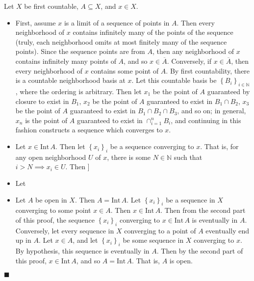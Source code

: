 \documentclass[12pt]{article}
\renewcommand{\qed}{\hfill$\blacksquare$}
\renewenvironment{proof}{\begin{addmargin}[1em]{0em}\begin{newproof}}{\end{newproof}\end{addmargin}\qed}
\begin{document}
\begin{proof}
Let $X$ be first countable, $A\subseteq X$, and $x\in X$.
\begin{itemize}
	\item First, assume $x$ is a limit of a sequence of points in $A$. Then every neighborhood of $x$ contains infinitely many of the points of the sequence (truly, each neighborhood omits at most finitely many of the sequence points). Since the sequence points are from $A$, then any neighborhood of $x$ contains infinitely many points of $A$, and so $x\in \overline{A}$. Conversely, if $x\in \overline{A}$, then every neighborhood of $x$ contains some point of $A$. By first countability, there is a countable neighborhood basis at $x$. Let this countable basis be $\left\{B_i\right\}_{i \in \mathbb{N}}$, where the ordering is arbitrary. Then let $x_1$ be the point of $A$ guaranteed by closure to exist in $B_1$, $x_2$ be the point of $A$ guaranteed to exist in $B_1\cap B_2$, $x_3$ be the point of $A$ guaranteed to exist in $B_1\cap B_2 \cap B_3$, and so on; in general, $x_n $ is the point of $A$ guaranteed to exist in $\cap_{i=1}^n B_i$, and continuing in this fashion constructs a sequence which converges to $x$.
	\item Let $x \in \text{Int}\,A$. Then let $\left\{x_i\right\}_i$ be a sequence converging to $x$. That is, for any open neighborhood $U$ of $x$, there is some $N\in \mathbb{N}$ such that $i>N \implies x_i \in U$. Then ]
	\item Let
	\item Let $A$ be open in $X$. Then $A=\text{Int}\, A$. Let $\left\{x_i\right\}_i$ be a sequence in $X$ converging to some point $x \in A$. Then $x\in \text{Int}\,A$. Then from the second part of this proof, the sequence $\left\{x_i\right\}_i$ converging to $x \in \text{Int}\, A$ is eventually in $A$. Conversely, let every sequence in $X$ converging to a point of $A$ eventually end up in $A$. Let $x \in A$, and let $\left\{x_i\right\}_i$ be some sequence in $X$ converging to $x$. By hypothesis, this sequence is eventually in $A$. Then by the second part of this proof, $x\in \text{Int}\,A$, and so $A=\text{Int}\,A$. That is, $A$ is open.
\end{itemize}
\end{proof}
\end{document}
